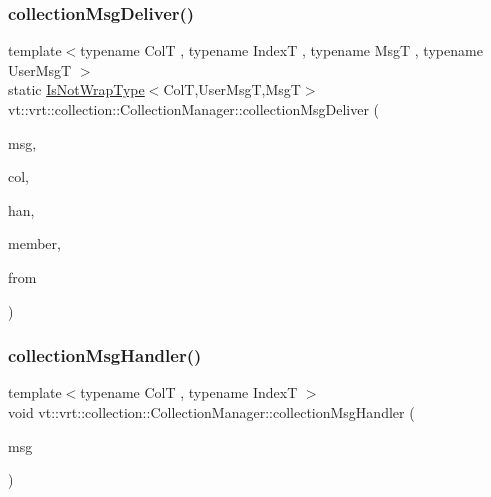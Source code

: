 \subsubsection{\texorpdfstring{collection\+Msg\+Deliver()}{collectionMsgDeliver()}\hspace{0.1cm}{\footnotesize\ttfamily [2/2]}}
{\footnotesize\ttfamily template$<$typename ColT , typename IndexT , typename MsgT , typename User\+MsgT $>$ \\
static \hyperlink{structvt_1_1vrt_1_1collection_1_1_collection_manager_a18e3a17d9eb086c6c2f499242b7faa1e}{Is\+Not\+Wrap\+Type}$<$ColT,User\+MsgT,MsgT$>$ vt\+::vrt\+::collection\+::\+Collection\+Manager\+::collection\+Msg\+Deliver (\begin{DoxyParamCaption}\item[{MsgT $\ast$}]{msg,  }\item[{\hyperlink{structvt_1_1vrt_1_1collection_1_1_collection_base}{Collection\+Base}$<$ ColT, IndexT $>$ $\ast$}]{col,  }\item[{\hyperlink{namespacevt_af64846b57dfcaf104da3ef6967917573}{Handler\+Type}}]{han,  }\item[{bool}]{member,  }\item[{\hyperlink{namespacevt_a866da9d0efc19c0a1ce79e9e492f47e2}{Node\+Type}}]{from }\end{DoxyParamCaption})\hspace{0.3cm}{\ttfamily [static]}}

\mbox{\label{structvt_1_1vrt_1_1collection_1_1_collection_manager_a9b2bfe1f74298f0e9b7fdc4888f73e3d}} 
\subsubsection{\texorpdfstring{collection\+Msg\+Handler()}{collectionMsgHandler()}}
{\footnotesize\ttfamily template$<$typename ColT , typename IndexT $>$ \\
void vt\+::vrt\+::collection\+::\+Collection\+Manager\+::collection\+Msg\+Handler (\begin{DoxyParamCaption}\item[{\hyperlink{namespacevt_ac34f95a5e2b8109b55bfba52b074443d}{Base\+Message} $\ast$}]{msg }\end{DoxyParamCaption})\hspace{0.3cm}{\ttfamily [static]}}

